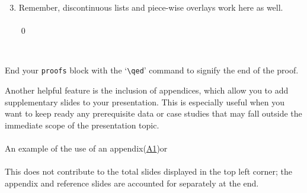 {\begin{frame}[fragile=singleslide]
    \begin{proofs}
    \begin{enumerate}
    \setcounter{enumi}{2}
    \item Remember, discontinuous lists and piece-wise overlays work here as well. 
    \\~\ \\
    {\gray \lipsum[5][2-4]} \qed
    \end{enumerate}~\
    \end{proofs}
    \begin{remark}
    End your \verb+proofs+ block with the `\verb+\qed+' command to signify the end of the proof.
    \end{remark}
    \end{frame}
}

\begin{frame}
    Another helpful feature is the inclusion of appendices, which allow you to add supplementary slides to your presentation. This is especially useful when you want to keep ready any prerequisite data or case studies that may fall outside the immediate scope of the presentation topic. 
    \\~\ \\ An example of the use of an appendix\dotfill (\hyperlink{app1}{A1})\quad or\quad\hyperlink{app1}{\beamergotobutton{Appendix I}}
    \\~\ \\
    This does not contribute to the total slides displayed in the top left corner; the appendix and reference slides are accounted for separately at the end.
\end{frame}